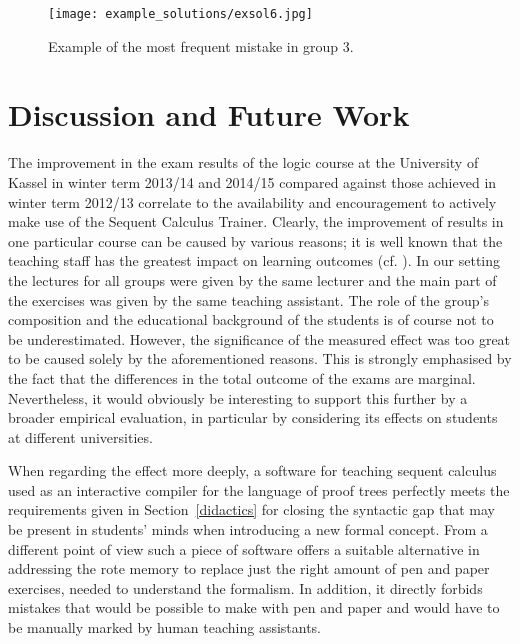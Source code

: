 \documentclass[a4paper,UKenglish]{lipics}
\begin{document}
\begin{figure}[t]
\begin{center}
\texttt{[image: example\_solutions/exsol6.jpg]}
\end{center}
\caption{Example of the most frequent mistake in group 3.}
\label{fig:solutions_group3}
\end{figure}






\section{Discussion and Future Work}

The improvement in the exam results of the logic course at the University of Kassel in winter term 2013/14 and 2014/15 compared against those achieved in
winter term 2012/13 correlate to the availability and encouragement to actively make use of the Sequent Calculus Trainer. Clearly, the improvement of
results in one particular course can be caused by various reasons; it is well known that the teaching staff has the greatest impact on learning outcomes
(cf. \cite{hattie2008visible}). In our setting the lectures for all groups were given by the same lecturer and the
main part of the exercises was given by the same teaching assistant. The role of the group's composition and the educational background of the students
is of course not to be underestimated. However, the significance of the measured effect was too great to be caused solely by the aforementioned
reasons. This is strongly emphasised by the fact that the differences in the total outcome of the exams are marginal. Nevertheless, it would obviously be
interesting to support this further by a broader empirical evaluation, in particular by considering its effects on students at different universities.

When regarding the effect more deeply, a software for teaching sequent calculus used as an interactive compiler for the language of proof trees perfectly
meets the requirements given in Section~\ref{didactics} for closing the syntactic gap that may be present in students' minds when introducing a new
formal concept. From a different point of view such a piece of software offers a suitable alternative in addressing the rote memory to replace just the
right amount of pen and paper exercises, needed to understand the formalism. In addition, it directly forbids mistakes that would be possible to make
with pen and paper and would have to be manually marked by human teaching assistants.
\end{document}
